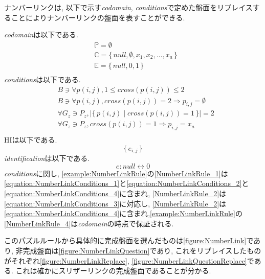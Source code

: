 \begin{example}[ナンバーリンクの数学的記述]
  ナンバーリンクは, 以下で示す\textit{codomain}, \textit{conditions}で定めた盤面をリプレイスすることによりナンバーリンクの盤面を表すことができる.

  \textit{codomain}は以下である.
  \begin{align}
     & \mathbb{P}=\emptyset                                             \\
     & \mathbb{C}=\{\,\textit{null}, \emptyset ,x_1,x_2,\ldots, x_a\,\} \\
     & \mathbb{E}=\{\,\textit{null},0,1\,\}                             \\
  \end{align}
  \textit{conditions}は以下である.
  \begin{align}
     & B\ni \forall p(i,j),1\le \textit{cross}(p(i,j))\le 2                          \label{equation:NumberLinkConditions_1} \\
     & B\ni \forall p(i,j),  \textit{cross}(p(i,j))= 2 \Rightarrow p_{i,j}=\emptyset \label{equation:NumberLinkConditions_2} \\
     & \forall G_z\ni P_z,        |\{\,p(i,j)\mid cross(p(i,j))=1\,\}|=2             \label{equation:NumberLinkConditions_3} \\
     & \forall G_z\ni P_z,     \textit{cross}(p(i,j))= 1 \Rightarrow p_{i,j}=x_a     \label{equation:NumberLinkConditions_4} \\
  \end{align}
  HIは以下である.
  \begin{equation}
    \{\,e_{i,j}\,\}
  \end{equation}
  \textit{identification}は以下である.
  \begin{equation}
    e:\textit{null}\leftrightarrow 0
  \end{equation}
  \textit{conditions}に関し, \cref{example:NumberLinkRule}の\ref{NumberLinkRule_1}は\cref{equation:NumberLinkConditions_1}と\cref{equation:NumberLinkConditions_2}と\cref{equation:NumberLinkConditions_4}に含まれ, \ref{NumberLinkRule_2}は\cref{equation:NumberLinkConditions_3}に対応し, \ref{NumberLinkRule_2}は\cref{equation:NumberLinkConditions_4}に含まれ,\cref{example:NumberLinkRule}の\ref{NumberLinkRule_4}は\textit{codomain}の時点で保証される.

  このパズルルールから具体的に完成盤面を選んだものは\cref{figure:NumberLink}であり, 非完成盤面は\cref{figure:NumberLinkQuestion}であり, これをリプレイスしたものがそれぞれ\cref{figure:NumberLinkReplace}, \cref{figure:NumberLinkQuestionReplace}である. これは確かにスリザーリンクの完成盤面であることが分かる.
\end{example}

